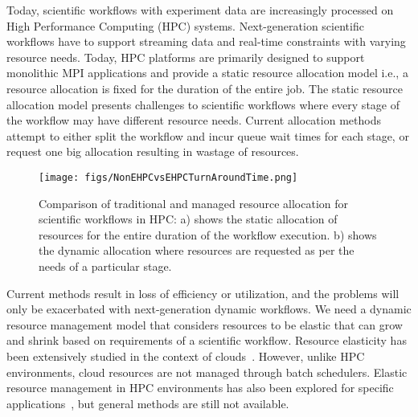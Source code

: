 Today, scientific workflows with experiment data are increasingly processed on High
Performance Computing (HPC) systems. Next-generation scientific
workflows have to support streaming data and real-time constraints with
varying resource needs.  Today, HPC platforms are primarily designed
to support monolithic MPI applications and provide a static resource
allocation model i.e., a resource allocation is fixed for the duration
of the entire job. The static resource allocation model 
presents challenges to scientific workflows where every stage of the
workflow may have different resource needs. Current allocation
methods attempt to either split the workflow and incur queue wait
times for each stage, or request one big allocation resulting in
wastage of resources.

\begin{figure}[htbp]
\centering
\texttt{[image: figs/NonEHPCvsEHPCTurnAroundTime.png]}
\caption{\small Comparison of traditional and \systemname managed resource allocation
 for scientific workflows in HPC: a) shows the static allocation of 
 resources for the entire duration of the workflow execution.
 b) shows the dynamic allocation where resources are requested as per the needs of a 
 particular stage.}
\label{fig:ehpc_overview}
\vspace{-0.5cm}
\end{figure}
 
Current methods result in loss of efficiency or utilization, and the
problems will only be exacerbated with next-generation dynamic
workflows. We need a dynamic resource management model that considers
resources to be elastic that can grow and shrink based on
requirements of a scientific workflow. Resource elasticity has
been extensively studied in the context of
clouds~\cite{sharma2011cost, galante2012survey, paraiso2016socloud}.
However, unlike HPC environments, cloud resources are not managed
through batch schedulers. Elastic resource management in HPC environments
has also been explored for specific applications~\cite{hpc_elastic_example1},
but general methods are still not available.

